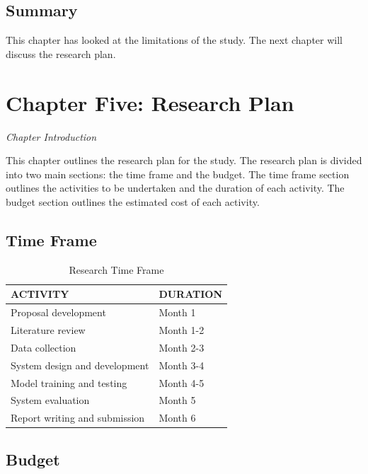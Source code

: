 \documentclass[12pt,a4paper]{article}
\begin{document}
\subsection{Summary}
This chapter has looked at the limitations of the study. The next chapter will discuss the research plan.

\newpage

\section{Chapter Five: Research Plan}
\textit{Chapter Introduction}

This chapter outlines the research plan for the study. The research plan is divided into two main sections: the time frame and the budget. The time frame section outlines the activities to be undertaken and the duration of each activity. The budget section outlines the estimated cost of each activity.

\subsection{Time Frame}

\begin{table}[htbp]
    \centering
    \begin{tabular}{ll}
        \toprule
        \textbf{ACTIVITY} & \textbf{DURATION} \\
        \midrule
        Proposal development & Month 1 \\
        Literature review & Month 1-2 \\
        Data collection & Month 2-3 \\
        System design and development & Month 3-4 \\
        Model training and testing & Month 4-5 \\
        System evaluation & Month 5 \\
        Report writing and submission & Month 6 \\
        \bottomrule
    \end{tabular}
    \caption{Research Time Frame}
\end{table}

\vspace{2em}

\subsection{Budget}
\end{document}
